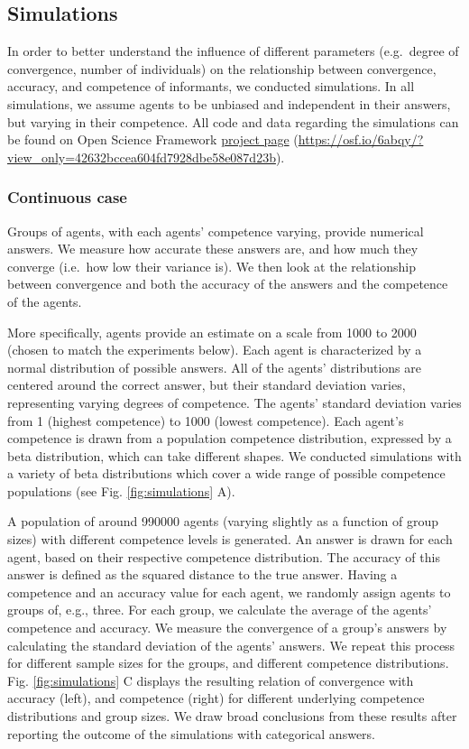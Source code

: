 \documentclass[
  doc,floatsintext]{apa6}
\begin{document}
\subsection{Simulations}\label{simulations}

In order to better understand the influence of different parameters (e.g.~degree of convergence, number of individuals) on the relationship between convergence, accuracy, and competence of informants, we conducted simulations. In all simulations, we assume agents to be unbiased and independent in their answers, but varying in their competence. All code and data regarding the simulations can be found on Open Science Framework \href{https://osf.io/6abqy/?view_only=42632bccea604fd7928dbe58e087d23b}{project page} (\url{https://osf.io/6abqy/?view_only=42632bccea604fd7928dbe58e087d23b}).

\subsubsection{Continuous case}\label{continuous-case}

Groups of agents, with each agents' competence varying, provide numerical answers. We measure how accurate these answers are, and how much they converge (i.e.~how low their variance is). We then look at the relationship between convergence and both the accuracy of the answers and the competence of the agents.

More specifically, agents provide an estimate on a scale from 1000 to 2000 (chosen to match the experiments below). Each agent is characterized by a normal distribution of possible answers. All of the agents' distributions are centered around the correct answer, but their standard deviation varies, representing varying degrees of competence. The agents' standard deviation varies from 1 (highest competence) to 1000 (lowest competence). Each agent's competence is drawn from a population competence distribution, expressed by a beta distribution, which can take different shapes. We conducted simulations with a variety of beta distributions which cover a wide range of possible competence populations (see Fig. \ref{fig:simulations} A).

A population of around 990000 agents (varying slightly as a function of group sizes) with different competence levels is generated. An answer is drawn for each agent, based on their respective competence distribution. The accuracy of this answer is defined as the squared distance to the true answer. Having a competence and an accuracy value for each agent, we randomly assign agents to groups of, e.g., three. For each group, we calculate the average of the agents' competence and accuracy. We measure the convergence of a group's answers by calculating the standard deviation of the agents' answers. We repeat this process for different sample sizes for the groups, and different competence distributions. Fig. \ref{fig:simulations} C displays the resulting relation of convergence with accuracy (left), and competence (right) for different underlying competence distributions and group sizes. We draw broad conclusions from these results after reporting the outcome of the simulations with categorical answers.
\end{document}
